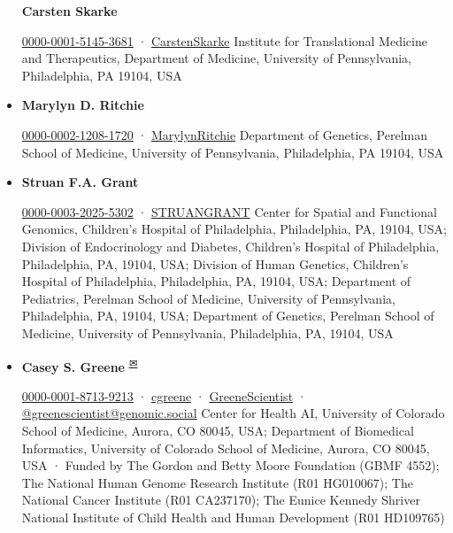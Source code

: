 \documentclass[
  legalpaperpaper,
]{article}
\begin{document}
\begin{itemize}
  \textbf{Carsten Skarke}
  
  \href{https://orcid.org/0000-0001-5145-3681}{0000-0001-5145-3681}
  · 
  \href{https://twitter.com/CarstenSkarke}{CarstenSkarke}
  Institute for Translational Medicine and Therapeutics, Department of Medicine, University of Pennsylvania, Philadelphia, PA 19104, USA
\item
  \textbf{Marylyn D. Ritchie}
  
  \href{https://orcid.org/0000-0002-1208-1720}{0000-0002-1208-1720}
  · 
  \href{https://twitter.com/MarylynRitchie}{MarylynRitchie}
  Department of Genetics, Perelman School of Medicine, University of Pennsylvania, Philadelphia, PA 19104, USA
\item
  \textbf{Struan F.A. Grant}
  
  \href{https://orcid.org/0000-0003-2025-5302}{0000-0003-2025-5302}
  · 
  \href{https://twitter.com/STRUANGRANT}{STRUANGRANT}
  Center for Spatial and Functional Genomics, Children's Hospital of Philadelphia, Philadelphia, PA, 19104, USA; Division of Endocrinology and Diabetes, Children's Hospital of Philadelphia, Philadelphia, PA, 19104, USA; Division of Human Genetics, Children's Hospital of Philadelphia, Philadelphia, PA, 19104, USA; Department of Pediatrics, Perelman School of Medicine, University of Pennsylvania, Philadelphia, PA, 19104, USA; Department of Genetics, Perelman School of Medicine, University of Pennsylvania, Philadelphia, PA, 19104, USA
\item
  \textbf{Casey S. Greene}
  \textsuperscript{\protect\hyperlink{correspondence}{✉}}
  
  \href{https://orcid.org/0000-0001-8713-9213}{0000-0001-8713-9213}
  · 
  \href{https://github.com/cgreene}{cgreene}
  · 
  \href{https://twitter.com/GreeneScientist}{GreeneScientist}
  · 
  \href{https://genomic.social/@greenescientist}{@greenescientist@genomic.social}
  Center for Health AI, University of Colorado School of Medicine, Aurora, CO 80045, USA; Department of Biomedical Informatics, University of Colorado School of Medicine, Aurora, CO 80045, USA
  · Funded by The Gordon and Betty Moore Foundation (GBMF 4552); The National Human Genome Research Institute (R01 HG010067); The National Cancer Institute (R01 CA237170); The Eunice Kennedy Shriver National Institute of Child Health and Human Development (R01 HD109765)
\end{itemize}
\end{document}
